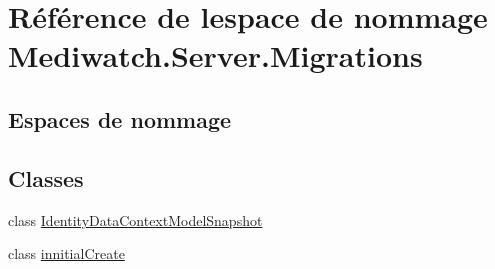 \hypertarget{namespace_mediwatch_1_1_server_1_1_migrations}{}\section{Référence de l\textquotesingle{}espace de nommage Mediwatch.\+Server.\+Migrations}
\label{namespace_mediwatch_1_1_server_1_1_migrations}
\subsection*{Espaces de nommage}
\begin{DoxyCompactItemize}
\end{DoxyCompactItemize}
\subsection*{Classes}
\begin{DoxyCompactItemize}
\item 
class \hyperlink{class_mediwatch_1_1_server_1_1_migrations_1_1_identity_data_context_model_snapshot}{Identity\+Data\+Context\+Model\+Snapshot}
\item 
class \hyperlink{class_mediwatch_1_1_server_1_1_migrations_1_1innitial_create}{innitial\+Create}
\end{DoxyCompactItemize}
